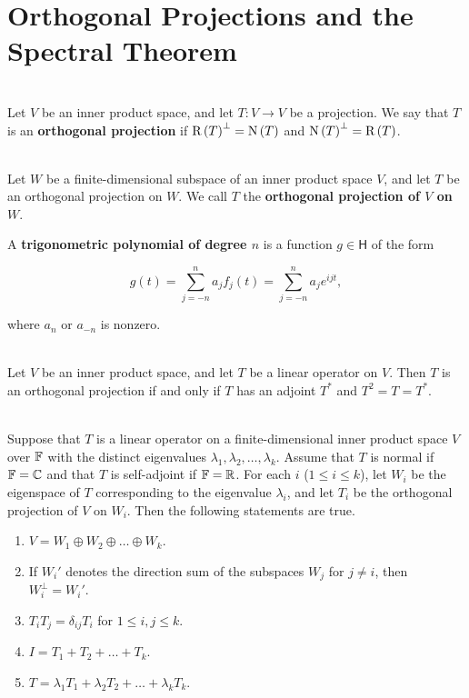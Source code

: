 \section{Orthogonal Projections and the Spectral Theorem}


\begin{definition}
	\hfill\\
	Let $V$ be an inner product space, and let $T: V \to V$ be a projection. We say that $T$ is an \textbf{orthogonal projection} if $\text{R}\left(T\right)^\perp = \text{N}\left(T\right)$ and $\text{N}\left(T\right)^\perp = \text{R}\left(T\right)$.
\end{definition}

\begin{definition}
	\hfill\\
	Let $W$ be a finite-dimensional subspace of an inner product space $V$, and let $T$ be an orthogonal projection on $W$. We call $T$ the \textbf{orthogonal projection of $V$ on $W$}.
\end{definition}

\begin{definition}
	A \textbf{trigonometric polynomial of degree $n$} is a function $g \in \mathsf{H}$ of the form

	\[g(t) = \sum_{j=-n}^{n}a_jf_j(t) = \sum_{j=-n}^{n}a_je^{ijt},\]

	where $a_n$ or $a_{-n}$ is nonzero.
\end{definition}

\begin{theorem}
	\hfill\\
	Let $V$ be an inner product space, and let $T$ be a linear operator on $V$. Then $T$ is an orthogonal projection if and only if $T$ has an adjoint $T^*$ and $T^2 = T = T^*$.
\end{theorem}

\begin{theorem}\label{The Spectral Theorem}
	\hfill\\
	Suppose that $T$ is a linear operator on a finite-dimensional inner product space $V$ over $\mathbb{F}$ with the distinct eigenvalues $\lambda_1, \lambda_2, \dots, \lambda_k$. Assume that $T$ is normal if $\mathbb{F} = \mathbb{C}$ and that $T$ is self-adjoint if $\mathbb{F} = \mathbb{R}$. For each $i$ ($1 \leq i \leq k$), let $W_i$ be the eigenspace of $T$ corresponding to the eigenvalue $\lambda_i$, and let $T_i$ be the orthogonal projection of $V$ on $W_i$. Then the following statements are true.

	\begin{enumerate}
		\item $V = W_1 \oplus W_2 \oplus \dots \oplus W_k$.
		\item If $W_i'$ denotes the direction sum of the subspaces $W_j$ for $j \neq i$, then $W_i^\perp = W_i'$.
		\item $T_iT_j = \delta_{ij}T_i$ for $1 \leq i, j \leq k$.
		\item $I = T_1 + T_2 + \dots + T_k$.
		\item $T = \lambda_1T_1 + \lambda_2T_2 + \dots + \lambda_kT_k$.
	\end{enumerate}
\end{theorem}

